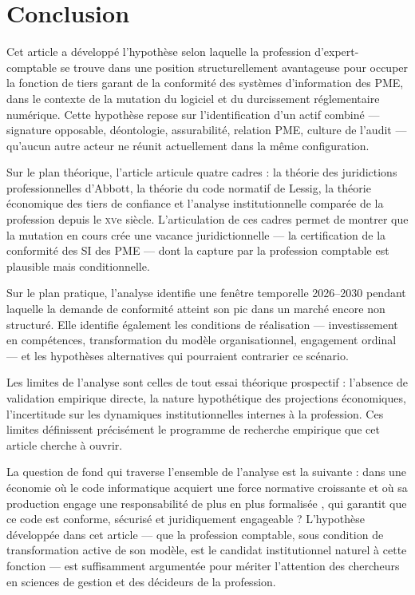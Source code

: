 \documentclass[12pt,a4paper]{article}
\begin{document}
\section{Conclusion}

Cet article a développé l'hypothèse selon laquelle la profession d'expert-comptable se trouve dans une position structurellement avantageuse pour occuper la fonction de tiers garant de la conformité des systèmes d'information des PME, dans le contexte de la mutation du logiciel et du durcissement réglementaire numérique. Cette hypothèse repose sur l'identification d'un actif combiné — signature opposable, déontologie, assurabilité, relation PME, culture de l'audit — qu'aucun autre acteur ne réunit actuellement dans la même configuration.

Sur le plan théorique, l'article articule quatre cadres : la théorie des juridictions professionnelles d'Abbott, la théorie du code normatif de Lessig, la théorie économique des tiers de confiance et l'analyse institutionnelle comparée de la profession depuis le \textsc{xv}e siècle. L'articulation de ces cadres permet de montrer que la mutation en cours crée une vacance juridictionnelle — la certification de la conformité des SI des PME — dont la capture par la profession comptable est plausible mais conditionnelle.

Sur le plan pratique, l'analyse identifie une fenêtre temporelle 2026--2030 pendant laquelle la demande de conformité atteint son pic dans un marché encore non structuré. Elle identifie également les conditions de réalisation — investissement en compétences, transformation du modèle organisationnel, engagement ordinal — et les hypothèses alternatives qui pourraient contrarier ce scénario.

Les limites de l'analyse sont celles de tout essai théorique prospectif : l'absence de validation empirique directe, la nature hypothétique des projections économiques, l'incertitude sur les dynamiques institutionnelles internes à la profession. Ces limites définissent précisément le programme de recherche empirique que cet article cherche à ouvrir.

La question de fond qui traverse l'ensemble de l'analyse est la suivante : dans une économie où le code informatique acquiert une force normative croissante \parencite{lessig2006} et où sa production engage une responsabilité de plus en plus formalisée \parencite{directive20242853}, qui garantit que ce code est conforme, sécurisé et juridiquement engageable ? L'hypothèse développée dans cet article — que la profession comptable, sous condition de transformation active de son modèle, est le candidat institutionnel naturel à cette fonction — est suffisamment argumentée pour mériter l'attention des chercheurs en sciences de gestion et des décideurs de la profession.

\printbibliography[title={Références bibliographiques}]
\end{document}
